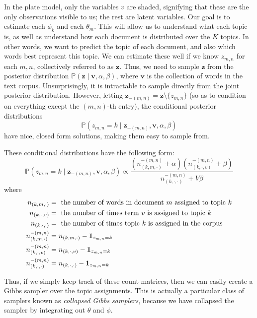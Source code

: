 In the plate model, only the variables $v$ are shaded, signifying that these are the only observations visible to us; the rest are latent variables. 
Our goal is to estimate each $\phi_{k}$ and each $\theta_{m}$. 
This will allow us to understand what each topic is, as well as understand how each document is distributed over the $K$ topics. 
In other words, we want to predict the topic of each document, and also which words best represent this topic.
We can estimate these well if we know $z_{m,n}$ for each $m, n$, collectively referred to as $\mathbf{z}$. 
Thus, we need to sample $\mathbf{z}$ from the posterior distribution $\mathbb{P}(\mathbf{z} \mid \mathbf{v}, \alpha, \beta)$, where $\mathbf{v}$ is the collection of words in the text corpus. 
Unsurprisingly, it is intractable to sample directly from the joint posterior distribution. 
However, letting $\mathbf{z}_{-(m,n)} = \mathbf{z}\setminus \{z_{m,n}\}$ (so as to condition on everything except the $(m,n)$-th entry), the conditional posterior distributions
\begin{equation*}
    \mathbb{P}(z_{m,n} = k \mid \mathbf{z}_{-(m,n)}, \mathbf{v}, \alpha, \beta)
\end{equation*}
have nice, closed form solutions, making them easy to sample from.

These conditional distributions have the following form:
\begin{equation*}
\mathbb{P}(z_{m,n} = k \mid \mathbf{z}_{-(m,n)}, \mathbf{v}, \alpha, \beta) \propto \frac{\left(n_{(k,m,\cdot)}^{-(m,n)} + \alpha\right)\left(n_{(k, \cdot, v)}^{-(m,n)} + \beta\right)}{n_{(k,\cdot,\cdot)}^{-(m,n)} + V \beta}
\end{equation*}
where
\begin{align*}
n_{(k,m,\cdot)} & = \mbox{ the number of words in document $m$ assigned to topic $k$} \\
n_{(k,\cdot,v)} & = \mbox{ the number of times term $v$ is assigned to topic $k$} \\
n_{(k,\cdot,\cdot)} & = \mbox{ the number of times topic $k$ is assigned in the corpus} \\
n_{(k,m,\cdot)}^{-(m,n)} & = n_{(k,m,\cdot)} - \boldsymbol{1}_{z_{m,n} = k} \\
n_{(k,\cdot,v)}^{-(m,n)} & = n_{(k,\cdot,v)} - \boldsymbol{1}_{z_{m,n} = k} \\
n_{(k,\cdot,\cdot)}^{-(m,n)} & = n_{(k,\cdot,\cdot)} - \boldsymbol{1}_{z_{m,n} = k}
\end{align*}

Thus, if we simply keep track of these count matrices, then we can easily create a Gibbs sampler over the topic assignments. 
This is actually a particular class of samplers known as \emph{collapsed Gibbs samplers}, because we have collapsed the sampler by integrating out $\theta$ and $\phi$.

